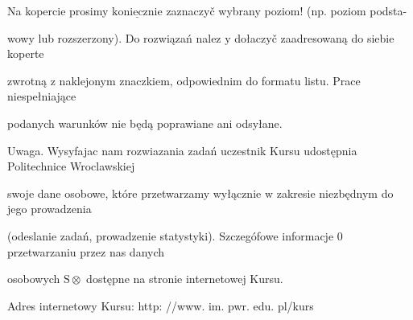 \documentclass[a4paper,12pt]{article}
\begin{document}
Na kopercie prosimy $\underline{\mathrm{k}\mathrm{o}\mathrm{n}\mathrm{i}\mathrm{e}\mathrm{c}\mathrm{z}\mathrm{n}\mathrm{i}\mathrm{e}}$ zaznaczyč wybrany poziom! (np. poziom podsta-

wowy lub rozszerzony). Do rozwiązań nalez $\mathrm{y}$ dołaczyč zaadresowaną do siebie koperte

zwrotną $\mathrm{z}$ naklejonym znaczkiem, odpowiednim do formatu listu. Prace niespełniające

podanych warunków nie będą poprawiane ani odsyłane.

Uwaga. Wysyfajac nam rozwiazania zadań uczestnik Kursu udostępnia Politechnice Wroclawskiej

swoje dane osobowe, które przetwarzamy wyłącznie $\mathrm{w}$ zakresie niezbędnym do jego prowadzenia

(odeslanie zadań, prowadzenie statystyki). Szczegófowe informacje $0$ przetwarzaniu przez nas danych

osobowych $\mathrm{S}\otimes$ dostępne na stronie internetowej Kursu.

Adres internetowy Kursu: http: //www. im. pwr. edu. pl/kurs
\end{document}
